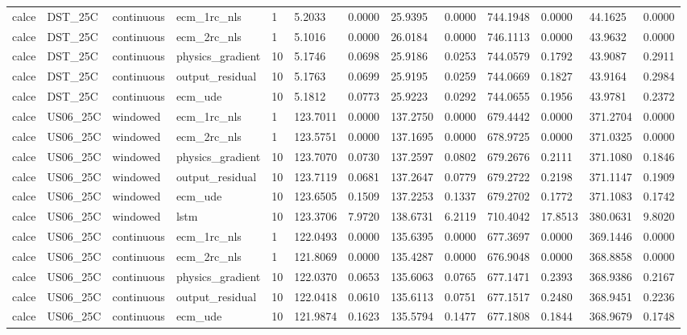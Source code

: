 \begin{tabular}{lllllllllllll}
calce & DST\_25C & continuous & ecm\_1rc\_nls & 1 & 5.2033 & 0.0000 & 25.9395 & 0.0000 & 744.1948 & 0.0000 & 44.1625 & 0.0000 \\
calce & DST\_25C & continuous & ecm\_2rc\_nls & 1 & 5.1016 & 0.0000 & 26.0184 & 0.0000 & 746.1113 & 0.0000 & 43.9632 & 0.0000 \\
calce & DST\_25C & continuous & physics\_gradient & 10 & 5.1746 & 0.0698 & 25.9186 & 0.0253 & 744.0579 & 0.1792 & 43.9087 & 0.2911 \\
calce & DST\_25C & continuous & output\_residual & 10 & 5.1763 & 0.0699 & 25.9195 & 0.0259 & 744.0669 & 0.1827 & 43.9164 & 0.2984 \\
calce & DST\_25C & continuous & ecm\_ude & 10 & 5.1812 & 0.0773 & 25.9223 & 0.0292 & 744.0655 & 0.1956 & 43.9781 & 0.2372 \\
calce & US06\_25C & windowed & ecm\_1rc\_nls & 1 & 123.7011 & 0.0000 & 137.2750 & 0.0000 & 679.4442 & 0.0000 & 371.2704 & 0.0000 \\
calce & US06\_25C & windowed & ecm\_2rc\_nls & 1 & 123.5751 & 0.0000 & 137.1695 & 0.0000 & 678.9725 & 0.0000 & 371.0325 & 0.0000 \\
calce & US06\_25C & windowed & physics\_gradient & 10 & 123.7070 & 0.0730 & 137.2597 & 0.0802 & 679.2676 & 0.2111 & 371.1080 & 0.1846 \\
calce & US06\_25C & windowed & output\_residual & 10 & 123.7119 & 0.0681 & 137.2647 & 0.0779 & 679.2722 & 0.2198 & 371.1147 & 0.1909 \\
calce & US06\_25C & windowed & ecm\_ude & 10 & 123.6505 & 0.1509 & 137.2253 & 0.1337 & 679.2702 & 0.1772 & 371.1083 & 0.1742 \\
calce & US06\_25C & windowed & lstm & 10 & 123.3706 & 7.9720 & 138.6731 & 6.2119 & 710.4042 & 17.8513 & 380.0631 & 9.8020 \\
calce & US06\_25C & continuous & ecm\_1rc\_nls & 1 & 122.0493 & 0.0000 & 135.6395 & 0.0000 & 677.3697 & 0.0000 & 369.1446 & 0.0000 \\
calce & US06\_25C & continuous & ecm\_2rc\_nls & 1 & 121.8069 & 0.0000 & 135.4287 & 0.0000 & 676.9048 & 0.0000 & 368.8858 & 0.0000 \\
calce & US06\_25C & continuous & physics\_gradient & 10 & 122.0370 & 0.0653 & 135.6063 & 0.0765 & 677.1471 & 0.2393 & 368.9386 & 0.2167 \\
calce & US06\_25C & continuous & output\_residual & 10 & 122.0418 & 0.0610 & 135.6113 & 0.0751 & 677.1517 & 0.2480 & 368.9451 & 0.2236 \\
calce & US06\_25C & continuous & ecm\_ude & 10 & 121.9874 & 0.1623 & 135.5794 & 0.1477 & 677.1808 & 0.1844 & 368.9679 & 0.1748 \\

\end{tabular}
